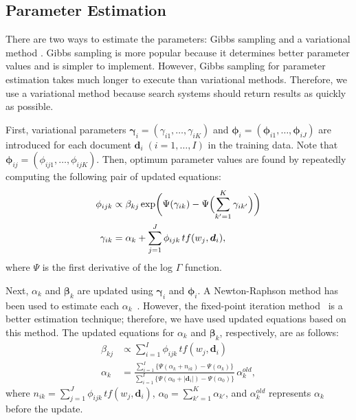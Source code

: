 \documentclass[english]{jnlp_1.4_rep}
\begin{document}
\subsection{Parameter Estimation}
\label{ssec:parameter_estimation}

There are two ways to estimate the parameters: Gibbs sampling and a
variational method \cite{Griffiths2004,Blei2003}. Gibbs sampling is more
popular because it determines better parameter values and is simpler to
implement. However, Gibbs sampling for parameter estimation takes much
longer to execute than variational methods. Therefore, we use a
variational method because search systems should return results as
quickly as possible.

First, variational parameters $\bm{\gamma}_{i} = (\gamma_{i1}, \dots,
\gamma_{iK})$ and $\bm{\phi}_{i} = (\bm{\phi}_{i1}, \dots,
\bm{\phi}_{iJ})$ are introduced for each document $\bm{d}_{i} \; (i = 1,
\dots, I)$ in the training data. Note that $\bm{\phi}_{ij} =
(\phi_{ij1}, \dots, \phi_{ijK})$. Then, optimum parameter values are
found by repeatedly computing the following pair of updated equations:
\begin{align}
 \phi_{ijk} & \propto
 \beta_{kj} \exp\biggl( \Psi(\gamma_{ik}) -
 \Psi\Bigl(\sum\limits_{k'=1}^{K} \gamma_{ik'}\Bigr)\biggr)
 \label{equ:phi}
 \\
 \gamma_{ik} & =  \alpha_{k} + \sum\limits_{j=1}^{J} \phi_{ijk} \, tf(w_{j},\bm{d}_{i}),
 \label{equ:gamma}
\end{align}
where $\Psi$ is the first derivative of the log $\Gamma$ function.

Next, $\alpha_{k}$ and $\bm{\beta}_{k}$ are updated using
$\bm{\gamma}_{i}$ and $\bm{\phi}_{i}$. A Newton-Raphson method has been
used to estimate each $\alpha_{k}$~\cite{Blei2003}. However, the
fixed-point iteration method~\cite{Minka2000} is a better estimation
technique; therefore, we have used updated equations based on this
method. The updated equations for $\alpha_{k}$ and $\bm{\beta}_{k}$,
respectively, are as follows:
\begin{align}
 \beta_{kj} & \propto \sum\limits_{i=1}^{I} \phi_{ijk} \, tf(w_{j},\bm{d}_{i})
 \label{equ:beta}
 \\
 \alpha_{k} & =  \frac
 { \sum_{i=1}^{I} \{ \Psi(\alpha_{k} + n_{ik})  - \Psi(\alpha_{k}) \} }
 { \sum_{i=1}^{I} \{ \Psi(\alpha_{0} + |\bm{d}_{i}|) - \Psi(\alpha_{0}) \} } \,
 \alpha_{k}^{old},
 \label{equ:alpha}
\end{align}
where $n_{ik} = \sum_{j=1}^{J} \phi_{ijk} \, tf(w_{j},\bm{d}_{i})$,
$\alpha_{0} = \sum_{k'=1}^{K} \alpha_{k'}$, and $\alpha_{k}^{old}$
represents $\alpha_{k}$ before the update.
\end{document}
